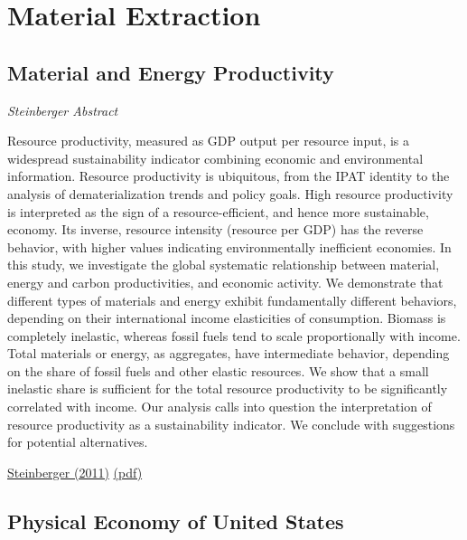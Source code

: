 \documentclass[
]{book}
\begin{document}
\hypertarget{material-extraction}{%
\chapter{Material Extraction}\label{material-extraction}}

\hypertarget{material-and-energy-productivity}{%
\section{Material and Energy Productivity}\label{material-and-energy-productivity}}

\emph{Steinberger Abstract}

Resource productivity, measured as GDP output per resource input, is a widespread sustainability indicator
combining economic and environmental information. Resource productivity is ubiquitous, from the IPAT identity to the analysis of
dematerialization trends and policy goals. High resource productivity is interpreted as the sign of a resource-efficient, and hence
more sustainable, economy. Its inverse, resource intensity (resource per GDP) has the reverse behavior, with higher values
indicating environmentally inefficient economies. In this study, we investigate the global systematic relationship between material,
energy and carbon productivities, and economic activity. We demonstrate that different types of materials and energy exhibit
fundamentally different behaviors, depending on their international income elasticities of consumption. Biomass is completely
inelastic, whereas fossil fuels tend to scale proportionally with income. Total materials or energy, as aggregates, have intermediate
behavior, depending on the share of fossil fuels and other elastic resources. We show that a small inelastic share is sufficient for the
total resource productivity to be significantly correlated with income. Our analysis calls into question the interpretation of resource
productivity as a sustainability indicator. We conclude with suggestions for potential alternatives.

\href{https://pubs.acs.org/doi/10.1021/es1028537\#}{Steinberger (2011)}
\href{pdf/Steinberger_2011_Material_and_Energy_Productivity.pdf}{(pdf)}

\hypertarget{physical-economy-of-united-states}{%
\section{Physical Economy of United States}\label{physical-economy-of-united-states}}
\end{document}
